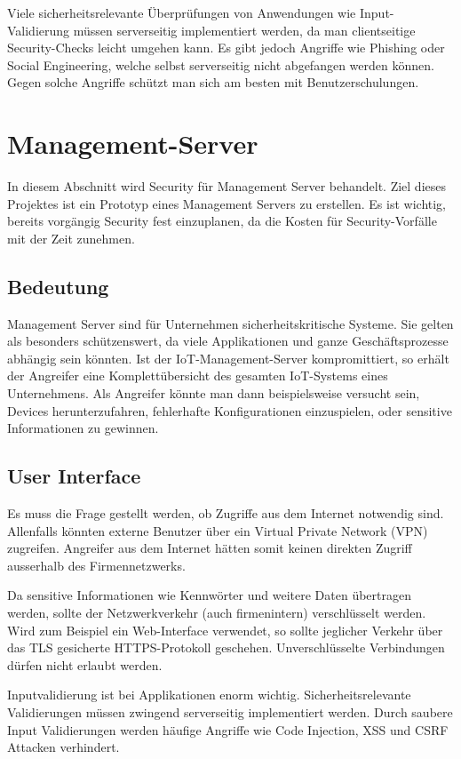Viele sicherheitsrelevante Überprüfungen von Anwendungen wie Input-Validierung müssen serverseitig implementiert werden, da man clientseitige Security-Checks leicht umgehen kann. Es gibt jedoch Angriffe wie Phishing oder Social Engineering, welche selbst serverseitig nicht abgefangen werden können. Gegen solche Angriffe schützt man sich am besten mit Benutzerschulungen.

\section{Management-Server}
In diesem Abschnitt wird Security für Management Server behandelt. Ziel dieses Projektes ist ein Prototyp eines Management Servers zu erstellen. Es ist wichtig, bereits vorgängig Security fest einzuplanen, da die Kosten für Security-Vorfälle mit der Zeit zunehmen.

\subsection{Bedeutung}
Management Server sind für Unternehmen sicherheitskritische Systeme. Sie gelten als besonders schützenswert, da viele Applikationen und ganze Geschäftsprozesse abhängig sein könnten. Ist der IoT-Management-Server kompromittiert, so erhält der Angreifer eine Komplettübersicht des gesamten IoT-Systems eines Unternehmens. Als Angreifer könnte man dann beispielsweise versucht sein, Devices herunterzufahren, fehlerhafte Konfigurationen einzuspielen, oder sensitive Informationen zu gewinnen.

\subsection{User Interface}
Es muss die Frage gestellt werden, ob Zugriffe aus dem Internet notwendig sind. Allenfalls könnten externe Benutzer über ein Virtual Private Network (VPN) zugreifen. Angreifer aus dem Internet hätten somit keinen direkten Zugriff ausserhalb des Firmennetzwerks.

Da sensitive Informationen wie Kennwörter und weitere Daten übertragen werden, sollte der Netzwerkverkehr (auch firmenintern) verschlüsselt werden. Wird zum Beispiel ein Web-Interface verwendet, so sollte jeglicher Verkehr über das TLS gesicherte HTTPS-Protokoll geschehen. Unverschlüsselte Verbindungen dürfen nicht erlaubt werden.

Inputvalidierung ist bei Applikationen enorm wichtig. Sicherheitsrelevante Validierungen müssen zwingend serverseitig implementiert werden. Durch saubere Input Validierungen werden häufige Angriffe wie Code Injection, XSS und CSRF Attacken verhindert.

